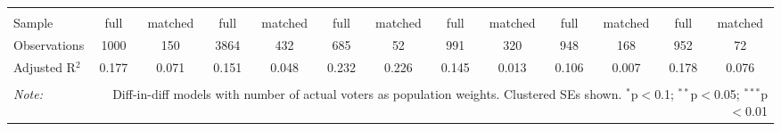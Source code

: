 \begin{table}[!htbp]
\begin{tabular}{@{\extracolsep{5pt}}lcccccccccccc}
 \hline \\[-1.8ex] 
Sample & full & matched & full & matched & full & matched & full & matched & full & matched & full & matched \\ 
Observations & 1000 & 150 & 3864 & 432 & 685 & 52 & 991 & 320 & 948 & 168 & 952 & 72 \\ 
Adjusted R$^{2}$ & 0.177 & 0.071 & 0.151 & 0.048 & 0.232 & 0.226 & 0.145 & 0.013 & 0.106 & 0.007 & 0.178 & 0.076 \\ 
\hline 
\hline \\[-1.8ex] 
\textit{Note:}  & \multicolumn{12}{r}{Diff-in-diff models with number of actual voters as population weights. Clustered SEs shown. $^{*}$p$<$0.1; $^{**}$p$<$0.05; $^{***}$p$<$0.01} \\ 
\end{tabular} 
\end{table} 
